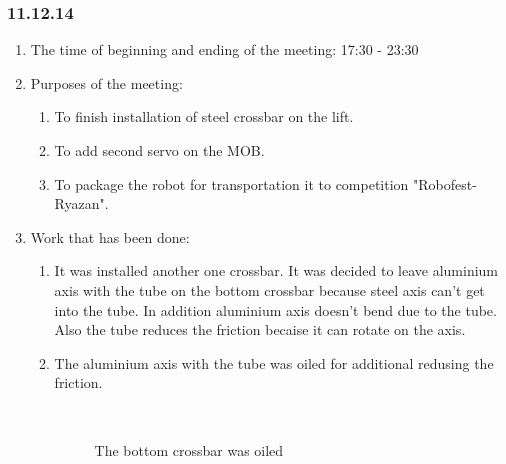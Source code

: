 \subsubsection{11.12.14}

\begin{enumerate}
	\item The time of beginning and ending of the meeting: 17:30 - 23:30
	\item Purposes of the meeting:
	\begin{enumerate}
		\item To finish installation of steel crossbar on the lift.
		
		\item To add second servo on the MOB.
		
		\item To package the robot for transportation it to competition "Robofest-Ryazan".
	\end{enumerate}
	\item Work that has been done:
	\begin{enumerate}
		\item It was installed another one crossbar. It was decided to leave aluminium axis with the tube on the bottom crossbar because steel axis can't get into the tube. In addition aluminium axis doesn't bend due to the tube. Also the tube reduces the friction becaise it can rotate on the axis.
		
		\item The aluminium axis with the tube was oiled for additional redusing the friction.
		
		\begin{figure}[H]
			\begin{minipage}[h]{0.2\linewidth}
				\center  
			\end{minipage}
			\begin{minipage}[h]{0.6\linewidth}
				\caption{The bottom crossbar was oiled}
			\end{minipage}
		\end{figure}
		

\end{enumerate}
\end{enumerate}
